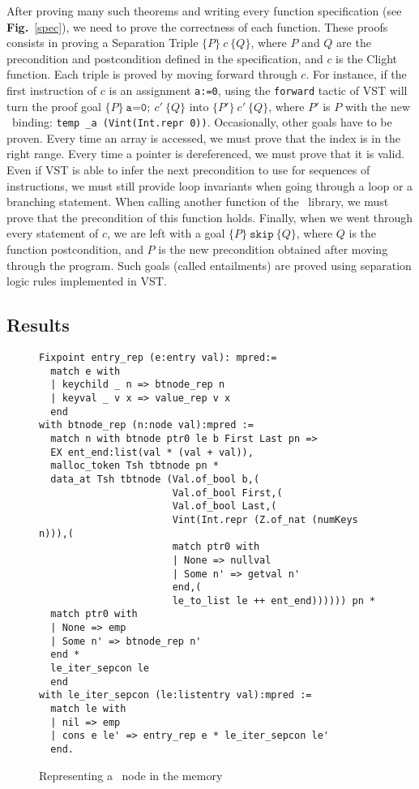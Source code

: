 After proving many such theorems and writing every function specification (see \textbf{Fig.}~\ref{spec}), we need to prove the correctness of each function.
These proofs consists in proving a Separation Triple $\{P\}~c~\{Q\}$, where $P$ and $Q$ are the precondition and postcondition defined in the specification, and $c$ is the Clight function.
Each triple is proved by moving forward through $c$.
For instance, if the first instruction of $c$ is an assignment \texttt{a:=0}, using the \lstinline[language=Coq]{forward} tactic of VST will turn the proof goal $\{P\}~\texttt{a=0};~c'~\{Q\}$ into $\{P'\}~c'~\{Q\}$,
where $P'$ is $P$ with the new \local\ binding: \texttt{temp \_a (Vint(Int.repr 0))}.
Occasionally, other goals have to be proven.
Every time an array is accessed, we must prove that the index is in the right range.
Every time a pointer is dereferenced, we must prove that it is valid.
Even if VST is able to infer the next precondition to use for sequences of instructions, we must still provide loop invariants when going through a loop or a branching statement.
When calling another function of the \btrees\ library, we must prove that the precondition of this function holds.
Finally, when we went through every statement of $c$, we are left with a goal $\{P\}~\texttt{skip}~\{Q\}$, where $Q$ is the function postcondition, and $P$ is the new precondition obtained after moving through the program.
Such goals (called entailments) are proved using separation logic rules implemented in VST.

\subsection{Results}



\begin{figure}
\begin{lstlisting}[language=Coq]
Fixpoint entry_rep (e:entry val): mpred:=
  match e with
  | keychild _ n => btnode_rep n
  | keyval _ v x => value_rep v x
  end
with btnode_rep (n:node val):mpred :=
  match n with btnode ptr0 le b First Last pn =>
  EX ent_end:list(val * (val + val)),
  malloc_token Tsh tbtnode pn *
  data_at Tsh tbtnode (Val.of_bool b,(
                       Val.of_bool First,(
                       Val.of_bool Last,(
                       Vint(Int.repr (Z.of_nat (numKeys n))),(
                       match ptr0 with
                       | None => nullval
                       | Some n' => getval n'
                       end,(
                       le_to_list le ++ ent_end)))))) pn *
  match ptr0 with
  | None => emp
  | Some n' => btnode_rep n'
  end *
  le_iter_sepcon le
  end
with le_iter_sepcon (le:listentry val):mpred :=
  match le with
  | nil => emp
  | cons e le' => entry_rep e * le_iter_sepcon le'
  end.
\end{lstlisting}
\caption{Representing a \btree\ node in the memory}
\label{btnoderep}
\end{figure}
